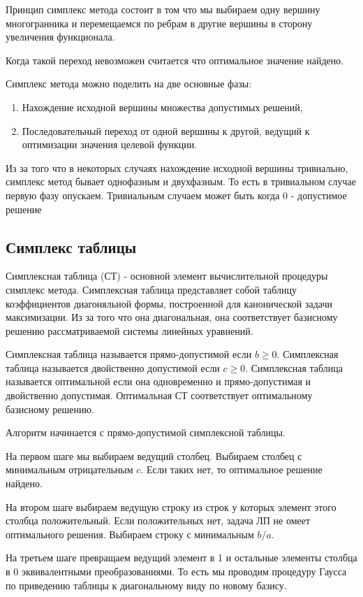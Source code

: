 \documentclass[a4paper,article,14pt]{extarticle}
\begin{document}
Принцип симплекс метода состоит в том что мы выбираем одну вершину многогранника и перемещаемся по ребрам в другие вершины в сторону увеличения функционала.

Когда такой переход невозможен считается что оптимальное значение найдено.

Симплекс метода можно поделить на две основные фазы:

\begin{enumerate}
    \item Нахождение исходной вершины множества допустимых решений,
    \item Последовательный переход от одной вершины к другой, ведущий к оптимизации значения целевой функции.
\end{enumerate}

Из за того что в некоторых случаях нахождение исходной вершины тривиально, симплекс метод бывает однофазным и двухфазным.
То есть в тривиальном случае первую фазу опускаем.
Тривиальным случаем может быть когда 0 - допустимое решение

\subsection{Симплекс таблицы}

Симплексная таблица (СТ) - основной элемент вычислительной процедуры симплекс метода.
Симплексная таблица представляет собой таблицу коэффициентов диагоняльной формы, построенной для канонической задачи максимизации.
Из за того что она диагональная, она соответствует базисному решению рассматриваемой системы линейных уравнений.

Симплексная таблица называется прямо-допустимой если \(b \ge 0\).
Симплексная таблица называется двойственно допустимой если \(c \ge 0\).
Симплексная таблица называется оптимальной если она одновременно и прямо-допустимая и двойственно допустимая.
Оптимальная СТ соответствует оптимальному базисному решению.

Алгоритм начинается с прямо-допустимой симплексной таблицы.

На первом шаге мы выбираем ведущий столбец.
Выбираем столбец с минимальным отрицательным \(c\).
Если таких нет, то оптимальное решение найдено.

На втором шаге выбираем ведущую строку из строк у которых элемент этого столбца положительный.
Если положительных нет, задача ЛП не омеет оптимального решения.
Выбираем строку с минимальным \(b/a\).

На третьем шаге превращаем ведущий элемент в 1 и остальные элементы столбца в 0 эквивалентными преобразованиями.
То есть мы проводим процедуру Гаусса по приведению таблицы к диагональному виду по новому базису.
\end{document}
